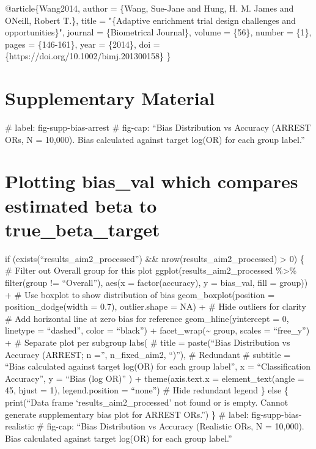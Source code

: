 \documentclass[
  letterpaper,
  DIV=11,
  numbers=noendperiod]{scrartcl}
\newenvironment{Shaded}{\begin{snugshade}}{\end{snugshade}}
\newcommand{\DataTypeTok}[1]{\textcolor[rgb]{0.68,0.00,0.00}{#1}}
\newcommand{\NormalTok}[1]{\textcolor[rgb]{0.00,0.23,0.31}{#1}}
\newcommand{\OtherTok}[1]{\textcolor[rgb]{0.00,0.23,0.31}{#1}}
\newcommand{\StringTok}[1]{\textcolor[rgb]{0.13,0.47,0.30}{#1}}
\newcommand{\VariableTok}[1]{\textcolor[rgb]{0.07,0.07,0.07}{#1}}
\begin{document}
\begin{Shaded}
\begin{Highlighting}[]
\VariableTok{@article}\NormalTok{\{}\OtherTok{Wang2014}\NormalTok{,}
    \DataTypeTok{author}\NormalTok{ = \{Wang, Sue{-}Jane and Hung, H. M. James and O\textquotesingle{}Neill, Robert T.\},}
    \DataTypeTok{title}\NormalTok{ = "}\StringTok{\{Adaptive enrichment trial design challenges and opportunities\}}\NormalTok{",}
    \DataTypeTok{journal}\NormalTok{ = \{Biometrical Journal\},}
    \DataTypeTok{volume}\NormalTok{ = \{56\},}
    \DataTypeTok{number}\NormalTok{ = \{1\},}
    \DataTypeTok{pages}\NormalTok{ = \{146{-}161\},}
    \DataTypeTok{year}\NormalTok{ = \{2014\},}
    \DataTypeTok{doi}\NormalTok{ = \{https://doi.org/10.1002/bimj.201300158\}}
\NormalTok{\}}
\end{Highlighting}
\end{Shaded}

\section{Supplementary Material}\label{supplementary-material}

\#\textbar{} label: fig-supp-bias-arrest \#\textbar{} fig-cap: ``Bias
Distribution vs Accuracy (ARREST ORs, N = 10,000). Bias calculated
against target log(OR) for each group label.''

\section{Plotting bias\_val which compares estimated beta to
true\_beta\_target}\label{plotting-bias_val-which-compares-estimated-beta-to-true_beta_target}

if (exists(``results\_aim2\_processed'') \&\&
nrow(results\_aim2\_processed) \textgreater{} 0) \{ \# Filter out
Overall group for this plot ggplot(results\_aim2\_processed
\%\textgreater\% filter(group != ``Overall''), aes(x = factor(accuracy),
y = bias\_val, fill = group)) + \# Use boxplot to show distribution of
bias geom\_boxplot(position = position\_dodge(width = 0.7),
outlier.shape = NA) + \# Hide outliers for clarity \# Add horizontal
line at zero bias for reference geom\_hline(yintercept = 0, linetype =
``dashed'', color = ``black'') + facet\_wrap(\textasciitilde{} group,
scales = ``free\_y'') + \# Separate plot per subgroup labs( \# title =
paste(``Bias Distribution vs Accuracy (ARREST; n ='', n\_fixed\_aim2,
``)''), \# Redundant \# subtitle = ``Bias calculated against target
log(OR) for each group label'', x = ``Classification Accuracy'', y =
``Bias (log OR)'' ) + theme(axis.text.x = element\_text(angle = 45,
hjust = 1), legend.position = ``none'') \# Hide redundant legend \} else
\{ print(``Data frame `results\_aim2\_processed' not found or is empty.
Cannot generate supplementary bias plot for ARREST ORs.'') \}
\#\textbar{} label: fig-supp-bias-realistic \#\textbar{} fig-cap: ``Bias
Distribution vs Accuracy (Realistic ORs, N = 10,000). Bias calculated
against target log(OR) for each group label.''
\end{document}
